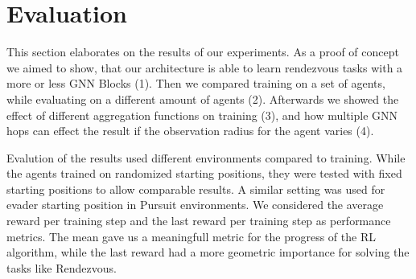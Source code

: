 
\chapter{Evaluation}
\label{ch:Evaluation}

This section elaborates on the results of our experiments. As a proof of concept we aimed to show, that our architecture is able to learn rendezvous tasks with a more or less GNN Blocks (1). Then we compared training on a set of agents, while evaluating on a different amount of agents (2). Afterwards we showed the effect of different aggregation functions on training (3), and how multiple GNN hops can effect the result if the observation radius for the agent varies (4). 
\par

Evalution of the results used different environments compared to training. While the agents trained on randomized starting positions, they were tested with fixed starting positions to allow comparable results. A similar setting was used for evader starting position in Pursuit environments. We considered the average reward per training step and the last reward per training step as performance metrics. The mean gave us a meaningfull metric for the progress of the RL algorithm, while the last reward had a more geometric importance for solving the tasks like Rendezvous.  \par

